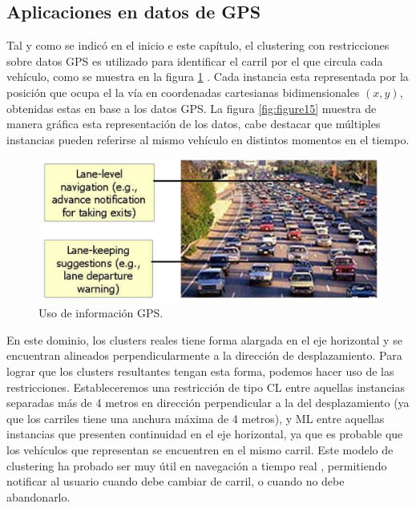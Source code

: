 \subsection{Aplicaciones en datos de GPS}

Tal y como se indicó en el inicio e este capítulo, el clustering con restricciones sobre datos \acs{GPS} es utilizado para identificar el carril por el que circula cada vehículo, como se muestra en la figura \ref{fig:figure14} \cite{Wagstaff:2001b}. Cada instancia esta representada por la posición que ocupa el la vía en coordenadas cartesianas bidimensionales $(x,y)$, obtenidas estas en base a los datos \acs{GPS}. La figura \ref{fig:figure15} muestra de manera gráfica esta representación de los datos, cabe destacar que múltiples instancias pueden referirse al mismo vehículo en distintos momentos en el tiempo.

\begin{figure}[!h]
	\centering
	\includegraphics[scale=0.3]{imagenes/c3/GPS/Coches} 
	\caption{Uso de información GPS. \cite{Survey:2007}}\label{fig:figure14}
\end{figure}


En este dominio, los clusters reales tiene forma alargada en el eje horizontal y se encuentran alineados perpendicularmente a la dirección de desplazamiento. Para lograr que los clusters resultantes tengan esta forma, podemos hacer uso de las restricciones. Estableceremos una restricción de tipo \acf{CL} entre aquellas instancias separadas más de 4 metros en dirección perpendicular a la del desplazamiento (ya que los carriles tiene una anchura máxima de 4 metros), y \acf{ML} entre aquellas instancias que presenten continuidad en el eje horizontal, ya que es probable que los vehículos que representan se encuentren en el mismo carril. Este modelo de clustering ha probado ser muy útil en navegación a tiempo real \cite{Wagstaff:2001b}, permitiendo notificar al usuario cuando debe cambiar de carril, o cuando no debe abandonarlo.

